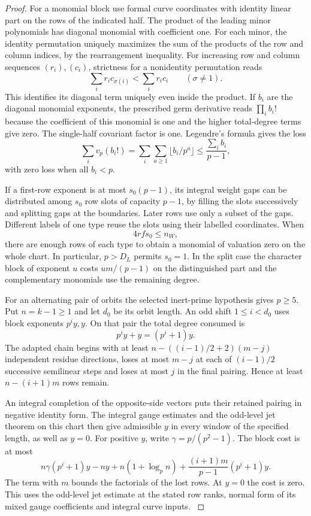 \begin{proof}
For a monomial block use formal curve coordinates with
identity linear part on the rows of the indicated half.
The product of the leading minor polynomials has
diagonal monomial with coefficient one. For each minor,
the identity permutation uniquely maximizes the sum of
the products of the row and column indices, by the
rearrangement inequality.
For increasing row and column sequences \((r_i),(c_i)\), strictness for a nonidentity permutation reads
\[
  \sum_i r_ic_{\sigma(i)}<\sum_i r_ic_i\qquad(\sigma\ne1).
\]
 This identifies its diagonal
term uniquely even inside the product. If \(b_i\) are the diagonal monomial exponents, the
prescribed germ derivative reads \(\prod_i b_i!\) because
the coefficient of this monomial is one and the higher
total-degree terms give zero. The single-half covariant
factor is one. Legendre's formula gives the loss
\[
         \sum_i v_p(b_i!)=\sum_i\sum_{a\ge1}\lfloor b_i/p^a\rfloor
                 \le \frac{\sum_i b_i}{p-1},
\]
with zero loss when all \(b_i<p\).

If a first-row
exponent is at most \(s_0(p-1)\), its integral weight gaps
can be distributed among \(s_0\) row slots of capacity
\(p-1\), by filling the slots successively and splitting
gaps at the boundaries. Later rows use only a subset of
the gaps. Different labels of one type reuse the slots
using their labelled coordinates. When 
\[
  4rf s_0\le n_W,
\]
there are enough rows of each type to obtain a monomial of valuation zero on the whole chart. In particular, \(p>D_L\) permits \(s_0=1\).
In the split case the character block of exponent \(u\)
costs \(u m/(p-1)\) on the distinguished part and the
complementary monomials use the remaining degree.
\label{cor:slice-unscaled-depth-6}

For an alternating pair of orbits the selected inert-prime
hypothesis gives \(p\ge5\). Put \(n=k-1\ge1\) and let
\(d_0\) be its orbit length. An odd shift \(1\le i<d_0\) uses block
exponents \(p^i y,y\).
On that pair the total degree consumed is
\[
  p^iy+y=(p^i+1)y .
\]
 The adapted chain begins with at least
\(n-((i-1)/2+2)(m-j)\) independent residue directions,
loses at most \(m-j\) at each of \((i-1)/2\) successive
semilinear steps and loses at most \(j\) in the final
pairing. Hence at least \(n-(i+1)m\) rows remain.

An integral completion of the opposite-side vectors puts
their retained pairing in negative identity form. The
integral gauge estimates and the odd-level jet theorem on
this chart then give admissible \(y\) in every window of
the specified length, as well as \(y=0\). For positive
\(y\), write \(\gamma=p/(p^2-1)\). The block cost is at most
\[
  n\gamma(p^i+1)y-ny+n(1+\log_p n)
                 +\frac{(i+1)m}{p-1}(p^i+1)y .
\]
The term with \(m\) bounds the factorials of the lost
rows. At \(y=0\) the cost is zero. This uses the odd-level
jet estimate at the stated row ranks, normal form of its
mixed gauge coefficients and integral curve inputs.
\label{cor:slice-unscaled-depth-7}


\end{proof}
